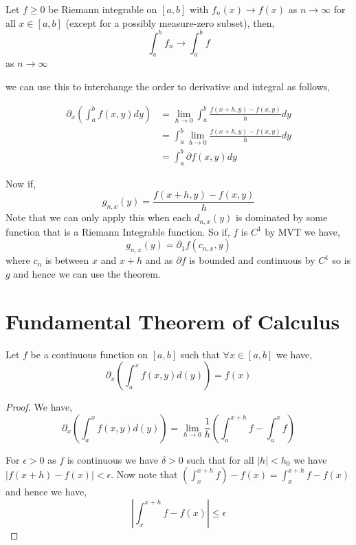 \begin{theorem}
    Let $f \ge 0$ be Riemann integrable on $[a, b]$ with $f_n(x) \to f(x)$ as $n \to \infty$ for all $x \in [a, b]$ (except for a possibly measure-zero subset), then, 
    \[
        \int_a^{b} f_n \to \int_{a}^{b} f
    \]
    as $n \to \infty$
    
\end{theorem}

we can use this to interchange the order to derivative and integral as follows, 

\begin{align*}
    \partial_x \left ( \int_{a}^{b} f(x, y)dy\right )&= \lim_{h \to 0} \int_{a}^{b}\frac{f(x + h, y) - f(x, y)}{h} dy\\
 &= \int_{a}^{b} \lim_{h \to 0} \frac{f(x + h, y) - f(x, y)}{h} dy\\
 &= \int_{a}^{b} \partial f(x, y) dy
\end{align*}

Now if,
\[
    g_{n,x}(y) = \frac{f(x + h, y) - f(x, y)}{h} 
\]
Note that we can only apply this when each $d_{n, x}(y)$ is dominated by some function that is a Riemann Integrable function. So if, $f$ is $C^{1}$ by MVT we have, 
\[
    g_{n, x}(y) = \partial_1 f (c_{n,x}, y)
\]
where $c_n$ is between $x$ and $x + h$ and as $\partial f$ is bounded and continuous by $C^{1}$ so is $g$ and hence we can use the theorem.

\section{Fundamental Theorem of Calculus}

\begin{theorem}
Let $f$ be a continuous function  on $[a,b]$ such that $\forall x \in [a, b]$ we have, 
\[
    \partial_x \left ( \int_{a}^{x} f(x, y) d(y)\right ) = f(x)
\]
\end{theorem}
\begin{proof}
    We have, 
    \[
    \partial_x \left ( \int_{a}^{x} f(x, y) d(y)\right ) =    \lim_{h \to 0} \frac{1}{h} \left ( \int_{a}^{x + h} f - \int_{a}^{x} f \right)
    \]

    For $\epsilon > 0$ as $f$ is continuous we have $\delta > 0$ such that for all $|h| < h_{0}$  we have $|f(x + h) - f(x)| < \epsilon$. Now note that $\left (\int_{x}^{x + h}f \right) - f(x) =  \int_{x}^{x + h}f - f(x) $ and hence we have, 
    \[
        \left | \int_{x}^{x + h} f - f(x)\right | \le \epsilon
    \]
\end{proof}


